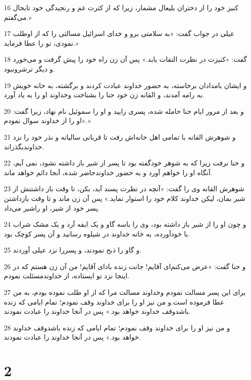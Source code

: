 \par 16 کنیز خود را از دختران بلیعال مشمار، زیرا که از کثرت غم و رنجیدگی خود تابحال می‌گفتم.»
\par 17 عیلی در جواب گفت: «به سلامتی برو و خدای اسرائیل مسالتی را که از اوطلب نمودی، تو را عطا فرماید.»
\par 18 گفت: «کنیزت در نظرت التفات یابد.» پس آن زن راه خود را پیش گرفت و می‌خورد و دیگر ترشرونبود.
\par 19 و ایشان بامدادان برخاسته، به حضور خداوند عبادت کردند و برگشته، به خانه خویش به رامه آمدند، و القانه زن خود حنا را بشناخت وخداوند او را به یاد آورد.
\par 20 و بعد از مرور ایام حنا حامله شده، پسری زایید و او را سموئیل نام نهاد، زیرا گفت: «او را از خداوند سوال نمودم.»
\par 21 و شوهرش القانه با تمامی اهل خانه‌اش رفت تا قربانی سالیانه و نذر خود را نزد خداوندبگذراند.
\par 22 و حنا نرفت زیرا که به شوهر خودگفته بود تا پسر از شیر باز داشته نشود، نمی آیم، آنگاه او را خواهم آورد و به حضور خداوندحاضر شده، آنجا دائم خواهد ماند.
\par 23 شوهرش القانه وی را گفت: «آنچه در نظرت پسند آید، بکن، تا وقت باز داشتنش از شیر بمان، لیکن خداوند کلام خود را استوار نماید.» پس آن زن ماند و تا وقت بازداشتن پسر خود از شیر، او راشیر می‌داد.
\par 24 و چون او را از شیر باز داشته بود، وی را باسه گاو و یک ایفه آرد و یک مشک شراب با خودآورده، به خانه خداوند در شیلوه رسانید و آن پسر کوچک بود.
\par 25 و گاو را ذبح نمودند، و پسررا نزد عیلی آوردند.
\par 26 و حنا گفت: «عرض می‌کنم‌ای آقایم! جانت زنده باد‌ای آقایم! من آن زن هستم که در اینجا نزد تو ایستاده، از خداوندمسئلت نمودم.
\par 27 برای این پسر مسالت نمودم وخداوند مسالت مرا که از او طلب نموده بودم، به من عطا فرموده است.و من نیز او را برای خداوند وقف نمودم؛ تمام ایامی که زنده باشدوقف خداوند خواهد بود.» پس در آنجا خداوند را عبادت نمودند.
\par 28 و من نیز او را برای خداوند وقف نمودم؛ تمام ایامی که زنده باشدوقف خداوند خواهد بود.» پس در آنجا خداوند را عبادت نمودند.
 
\chapter{2}

